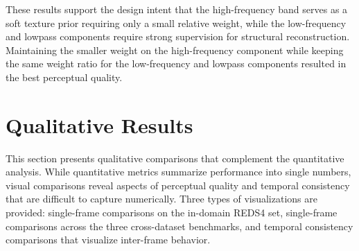 \begin{table}[b]
\caption{The comparison of perceptual quality on REDS4 with 
various combinations of weights on each individual loss 
component.}
\centering
{}
\label{tab:additional_lambda2}
\end{table}

These results support the design intent that the 
high-frequency band serves as a soft texture prior requiring 
only a small relative weight, while the low-frequency and 
lowpass components require strong supervision for structural 
reconstruction. Maintaining the smaller weight on the 
high-frequency component while keeping the same weight ratio 
for the low-frequency and lowpass components resulted in the 
best perceptual quality.


\section{Qualitative Results}
\label{sec:qualitative}

This section presents qualitative comparisons that complement 
the quantitative analysis. While quantitative metrics summarize 
performance into single numbers, visual comparisons reveal 
aspects of perceptual quality and temporal consistency that 
are difficult to capture numerically. Three types of 
visualizations are provided: single-frame comparisons on the 
in-domain REDS4 set, single-frame comparisons across the three 
cross-dataset benchmarks, and temporal consistency comparisons 
that visualize inter-frame behavior.


